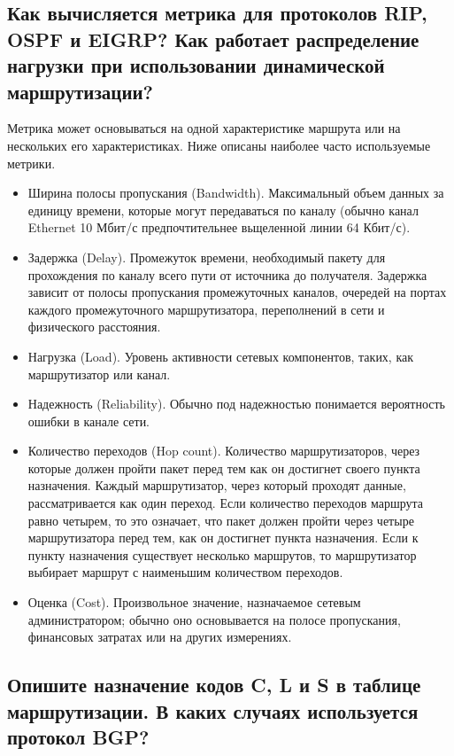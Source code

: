 \subsection{Как вычисляется метрика для протоколов RIP, OSPF и EIGRP?
Как работает распределение нагрузки
при использовании динамической маршрутизации?}

Метрика может основываться на одной характеристике маршрута или на нескольких его характеристиках. Ниже описаны наиболее часто используемые метрики.

\begin{itemize}
    \item Ширина полосы пропускания (Bandwidth).
    Максимальный объем данных за единицу времени,
    которые могут передаваться по каналу
    (обычно канал Ethernet 10 Мбит/с предпочтительнее вьщеленной
    линии 64 Кбит/с).
    \item Задержка (Delay). Промежуток времени, необходимый пакету
    для прохождения по каналу всего пути от источника до получателя.
    Задержка зависит от полосы пропускания промежуточных каналов,
    очередей на портах каждого промежуточного маршрутизатора,
    переполнений в сети и физического расстояния.
    \item Нагрузка (Load). Уровень активности сетевых компонентов, таких,
    как маршрутизатор или канал.
    \item Надежность (Reliability). Обычно под надежностью понимается
    вероятность ошибки в канале сети.
    \item Количество переходов (Hop count). Количество маршрутизаторов,
    через которые должен пройти пакет перед тем как он достигнет своего
    пункта назначения. Каждый маршрутизатор, через который проходят
    данные, рассматривается как один переход.
    Если количество переходов маршрута равно четырем, то это означает,
    что пакет должен пройти через четыре маршрутизатора перед тем,
    как он достигнет пункта назначения. Если к пункту назначения
    существует несколько маршрутов, то маршрутизатор выбирает маршрут
    с наименьшим количеством переходов.
    \item Оценка (Cost). Произвольное значение, назначаемое сетевым
    администратором; обычно оно основывается на полосе пропускания,
    финансовых затратах или на других измерениях.
\end{itemize}

\subsection{Опишите назначение кодов C, L и S в таблице маршрутизации.
В каких случаях используется протокол BGP?}

